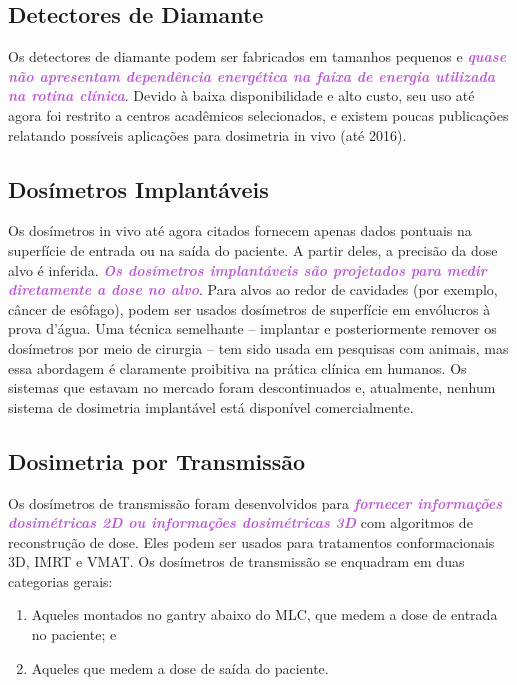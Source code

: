 \documentclass[11pt,a4paper]{article}
\newcounter{exemplo}
\begin{document}
\subsection*{Detectores de Diamante}

	Os detectores de diamante podem ser fabricados em tamanhos pequenos e \textcolor{MediumOrchid}{\textbf{\textit{quase não apresentam dependência energética na faixa de energia utilizada na rotina clínica}}}. Devido à baixa disponibilidade e alto custo, seu uso até agora foi restrito a centros acadêmicos selecionados, e existem poucas publicações relatando possíveis aplicações para dosimetria in vivo (até 2016).

\subsection*{Dosímetros Implantáveis}

	Os dosímetros in vivo até agora citados fornecem apenas dados pontuais na superfície de entrada ou  na saída do paciente. A partir deles, a precisão da dose alvo é inferida. \textcolor{MediumOrchid}{\textbf{\textit{Os dosímetros implantáveis são projetados para medir diretamente a dose no alvo}}}. Para alvos ao redor de cavidades (por exemplo, câncer de esôfago), podem ser usados dosímetros de superfície em envólucros à prova d'água. Uma técnica semelhante -- implantar e posteriormente remover os dosímetros por meio de cirurgia -- tem sido usada em pesquisas com animais, mas essa abordagem é claramente proibitiva na prática clínica em humanos. Os sistemas que estavam no mercado foram descontinuados e, atualmente, nenhum sistema de dosimetria implantável está disponível comercialmente.

\subsection*{Dosimetria por Transmissão}

	Os dosímetros de transmissão foram desenvolvidos para \textcolor{MediumOrchid}{\textbf{\textit{fornecer informações dosimétricas 2D ou informações dosimétricas 3D}}} com algoritmos de reconstrução de dose. Eles podem ser usados para tratamentos conformacionais 3D, IMRT e VMAT. Os dosímetros de transmissão se enquadram em duas categorias gerais:
	
	\begin{enumerate}
		\item Aqueles montados no gantry abaixo do MLC, que medem a dose de entrada no paciente; e
		\item Aqueles que medem a dose de saída do paciente.
	\end{enumerate} 
\end{document}

